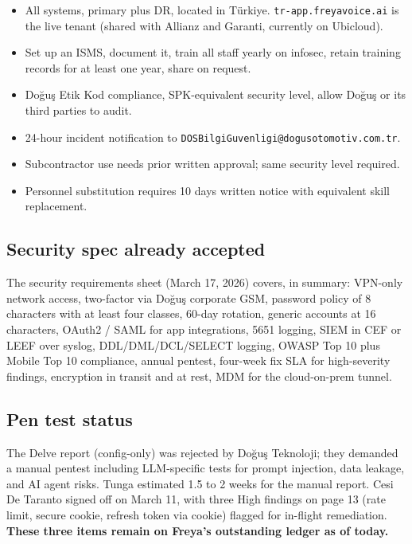 \documentclass[10pt,a4paper]{article}
\begin{document}
\begin{itemize}[leftmargin=1em,itemsep=0.2em]
\item All systems, primary plus DR, located in Türkiye. \texttt{tr-app.freyavoice.ai} is the live tenant (shared with Allianz and Garanti, currently on Ubicloud).
\item Set up an ISMS, document it, train all staff yearly on infosec, retain training records for at least one year, share on request.
\item Doğuş Etik Kod compliance, SPK-equivalent security level, allow Doğuş or its third parties to audit.
\item 24-hour incident notification to \texttt{DOSBilgiGuvenligi@dogusotomotiv.com.tr}.
\item Subcontractor use needs prior written approval; same security level required.
\item Personnel substitution requires 10 days written notice with equivalent skill replacement.
\end{itemize}

\subsection{Security spec already accepted}

The security requirements sheet (March 17, 2026) covers, in summary: VPN-only network access, two-factor via Doğuş corporate GSM, password policy of 8 characters with at least four classes, 60-day rotation, generic accounts at 16 characters, OAuth2 / SAML for app integrations, 5651 logging, SIEM in CEF or LEEF over syslog, DDL/DML/DCL/SELECT logging, OWASP Top 10 plus Mobile Top 10 compliance, annual pentest, four-week fix SLA for high-severity findings, encryption in transit and at rest, MDM for the cloud-on-prem tunnel.

\subsection{Pen test status}

The Delve report (config-only) was rejected by Doğuş Teknoloji; they demanded a manual pentest including LLM-specific tests for prompt injection, data leakage, and AI agent risks. Tunga estimated 1.5 to 2 weeks for the manual report. Cesi De Taranto signed off on March 11, with three High findings on page 13 (rate limit, secure cookie, refresh token via cookie) flagged for in-flight remediation. \textbf{These three items remain on Freya's outstanding ledger as of today.}
\end{document}
